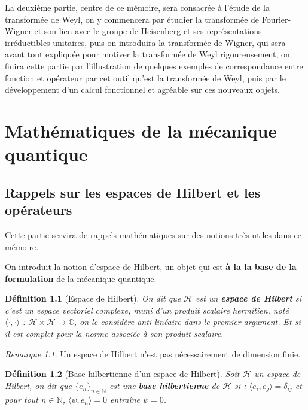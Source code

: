 \documentclass[a4paper, 12pt]{report}
\renewcommand{\.}{\cdot} %
\newcommand\emptypage{
    \null
    \thispagestyle{empty}
    
    \newpage
    }
\theoremstyle{break}
\newtheorem{definition}{Définition}
\theoremstyle{remark}
\newtheorem{remark}{Remarque}
\theoremstyle{proofstyle}
\begin{document}
La deuxième partie, centre de ce mémoire, sera consacrée à l'étude de la transformée de Weyl, on y commencera par étudier la transformée de Fourier-Wigner et son lien avec le groupe de Heisenberg et ses représentations irréductibles unitaires, puis on introduira la transformée de Wigner, qui sera avant tout expliquée pour motiver la transformée de Weyl rigoureusement, on finira cette partie par l'illustration de quelques exemples de correspondance entre fonction et opérateur par cet outil qu'est la transformée de Weyl, puis par le développement d'un calcul fonctionnel et agréable sur ces nouveaux objets. \vspace{10pt}
\emptypage

\tableofcontents


\emptypage
\emptypage

\chapter{Mathématiques de la mécanique quantique}

\section{Rappels sur les espaces de Hilbert et les opérateurs}
Cette partie servira de rappels mathématiques sur des notions très utiles dans ce mémoire.

On introduit la notion d'espace de Hilbert, un objet qui est \textbf{à la la base de la formulation} de la mécanique quantique.

\begin{definition}[Espace de Hilbert]
    On dit que $\mathcal{H}$ est un \textbf{espace de Hilbert} si c'est un espace vectoriel complexe, muni d'un produit scalaire hermitien, noté $\langle \cdot, \cdot \rangle$ : $\mathcal{H} \times \mathcal{H} \rightarrow \mathbb{C}$, on le considère anti-linéaire dans le premier argument. Et si il est complet pour la norme associée à son produit scalaire.
\end{definition}


\begin{remark}
    Un espace de Hilbert n'est pas nécessairement de dimension finie.
\end{remark}

\begin{definition}[Base hilbertienne d'un espace de Hilbert]
    Soit $\mathcal{H}$ un espace de Hilbert, on dit que $\{e_n\}_{n \in \mathbb{N}}$ est une \textbf{base hilbertienne} de $\mathcal{H}$ si :
    $\langle e_i, e_j \rangle = \delta_{ij}$ et pour tout $n \in \mathbb{N}$, $\langle \psi, e_n \rangle = 0$ entraîne $\psi = 0$.
\end{definition}
\end{document}
